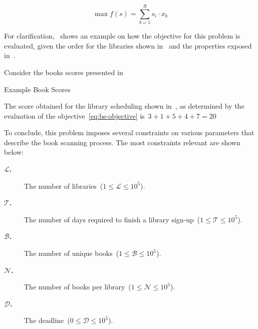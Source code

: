 \begin{equation}
  \label{eq:bs-objective}
  \max{f(s)} = \sum_{b = 1}^{\mathcal{B}}{s_{i} \cdot x_{b}}
\end{equation}

For clarification,~ shows an example on how the
objective for this problem is evaluated, given the order for the libraries shown
in~ and the properties exposed in~.

\begin{example}
  \label{ex:bs-problem-scoring}
  Consider the books scores presented in~

  \begin{table}[ht]
    \centering
    
    \caption{Example Book Scores}
    \label{tab:bs-example}
  \end{table}

  The score obtained for the library scheduling shown in~,
  as determined by the evaluation of the objective~\ref{eq:bs-objective} is~$3 +
    1 + 5 + 4 + 7 = 20$
\end{example}

To conclude, this problem imposes several constraints on various parameters that
describe the book scanning process. The most constraints relevant are shown below:

\begin{description}
  \item[\textbf{$\mathcal{L}$.}] The number of libraries~($ 1 \leq \mathcal{L} \leq 10^5$).
  \item[\textbf{$\mathcal{T}$.}] The number of days required to finish a library sign-up~($ 1 \leq \mathcal{T} \leq 10^5$).
  \item[\textbf{$\mathcal{B}$.}] The number of unique books~($ 1 \leq \mathcal{B} \leq 10^5$).
  \item[\textbf{$\mathcal{N}$.}] The number of books per library~($ 1 \leq \mathcal{N} \leq 10^5$).
  \item[\textbf{$\mathcal{D}$.}] The deadline~($ 0 \leq \mathcal{D} \leq 10^5$).
\end{description}